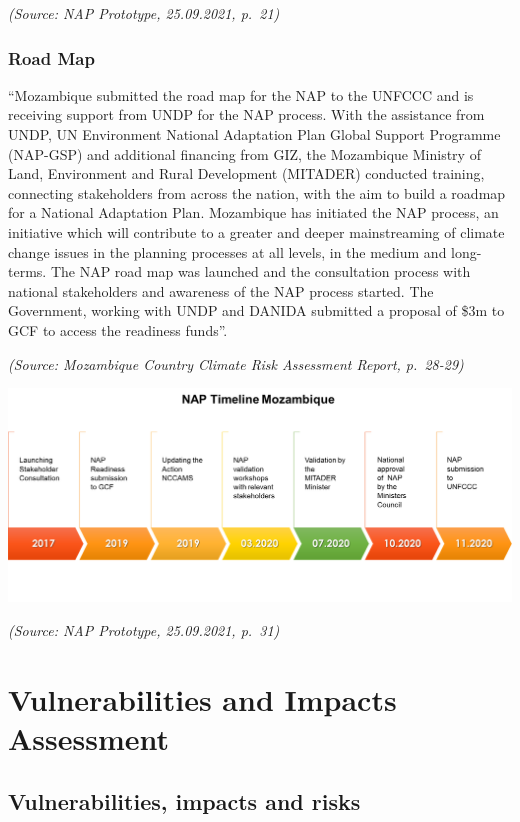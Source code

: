 \documentclass[
]{book}
\begin{document}
\emph{(Source: NAP Prototype, 25.09.2021, p.~21)}

\hypertarget{road-map}{%
\subsection{Road Map}\label{road-map}}

``Mozambique submitted the road map for the NAP to the UNFCCC and is receiving support from UNDP for the NAP process. With the assistance from UNDP, UN Environment National Adaptation Plan Global Support Programme (NAP-GSP) and additional financing from GIZ, the Mozambique Ministry of Land, Environment and Rural Development (MITADER) conducted training, connecting stakeholders from across the nation, with the aim to build a roadmap for a National Adaptation Plan. Mozambique has initiated the NAP process, an initiative which will contribute to a greater and deeper mainstreaming of climate change issues in the planning processes at all levels, in the medium and long-terms. The NAP road map was launched and the consultation process with national stakeholders and awareness of the NAP process started. The Government, working with UNDP and DANIDA submitted a proposal of \$3m to GCF to access the readiness funds''.

\emph{(Source: Mozambique Country Climate Risk Assessment Report, p.~28-29)}

\includegraphics{Figure21.png}

\emph{(Source: NAP Prototype, 25.09.2021, p.~31)}

\hypertarget{vulnerabilities-and-impacts-assessment}{%
\chapter{Vulnerabilities and Impacts Assessment}\label{vulnerabilities-and-impacts-assessment}}

\hypertarget{vulnerabilities-impacts-and-risks}{%
\section{Vulnerabilities, impacts and risks}\label{vulnerabilities-impacts-and-risks}}
\end{document}
